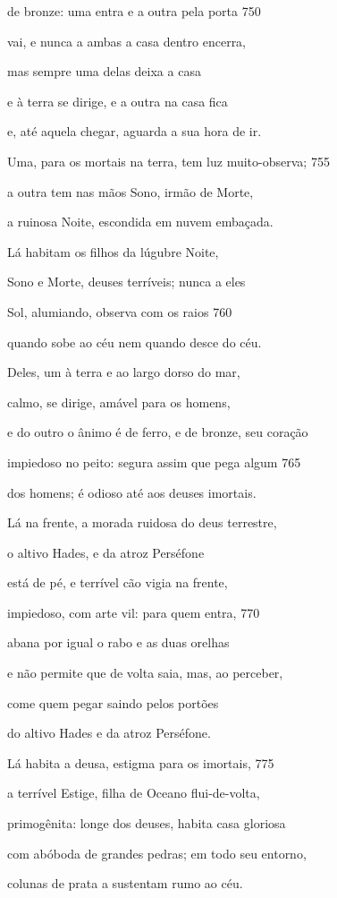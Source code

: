 de bronze: uma entra e a outra pela porta \num{750}

vai, e nunca a ambas a casa dentro encerra,

mas sempre uma delas deixa a casa

e à terra se dirige, e a outra na casa fica

e, até aquela chegar, aguarda a sua hora de ir.

Uma, para os mortais na terra, tem luz muito-observa; \num{755}

a outra tem nas mãos Sono, irmão de Morte,

a ruinosa Noite, escondida em nuvem embaçada.

\quad{}Lá habitam os filhos da lúgubre Noite,

Sono e Morte, deuses terríveis; nunca a eles

Sol, alumiando, observa com os raios \num{760}

quando sobe ao céu nem quando desce do céu.

Deles, um à terra e ao largo dorso do mar,

calmo, se dirige, amável para os homens,

e do outro o ânimo é de ferro, e de bronze, seu coração

impiedoso no peito: segura assim que pega algum \num{765}

dos homens; é odioso até aos deuses imortais.

\quad{}Lá na frente, a morada ruidosa do deus terrestre,

o altivo Hades, e da atroz Perséfone

está de pé, e terrível cão vigia na frente,

impiedoso, com arte vil: para quem entra, \num{770}

abana por igual o rabo e as duas orelhas

e não permite que de volta saia, mas, ao perceber,

come quem pegar saindo pelos portões

do altivo Hades e da atroz Perséfone.

\quad{}Lá habita a deusa, estigma para os imortais, \num{775}

a terrível Estige, filha de Oceano flui-de-volta,

primogênita: longe dos deuses, habita casa gloriosa

com abóboda de grandes pedras; em todo seu entorno,

colunas de prata a sustentam rumo ao céu.

